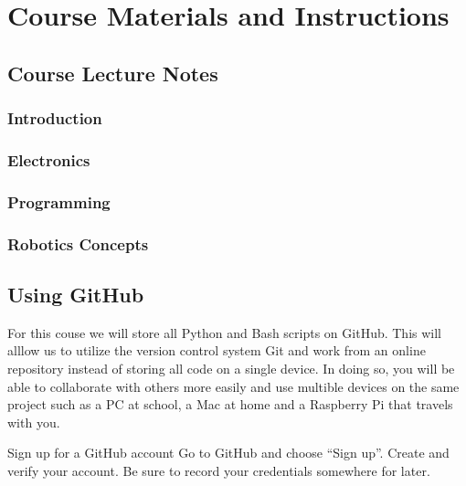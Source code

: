 \documentclass[
]{book}
\begin{document}
\hypertarget{course-materials-and-instructions}{%
\chapter{Course Materials and Instructions}\label{course-materials-and-instructions}}

\hypertarget{course-lecture-notes}{%
\section{Course Lecture Notes}\label{course-lecture-notes}}

\hypertarget{introduction}{%
\subsection{Introduction}\label{introduction}}

\hypertarget{electronics}{%
\subsection{Electronics}\label{electronics}}

\hypertarget{programming}{%
\subsection{Programming}\label{programming}}

\hypertarget{robotics-concepts}{%
\subsection{Robotics Concepts}\label{robotics-concepts}}

\hypertarget{using-github}{%
\section{Using GitHub}\label{using-github}}

For this couse we will store all Python and Bash scripts on GitHub. This will alllow us to utilize the version control system Git and work from an online repository instead of storing all code on a single device. In doing so, you will be able to collaborate with others more easily and use multible devices on the same project such as a PC at school, a Mac at home and a Raspberry Pi that travels with you.

Sign up for a GitHub account
Go to GitHub and choose ``Sign up''. Create and verify your account. Be sure to record your credentials somewhere for later.
\end{document}
